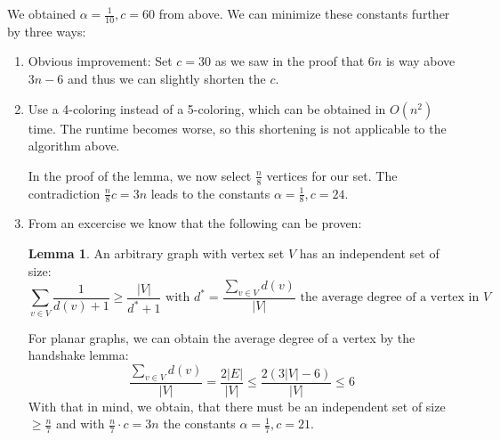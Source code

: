 \documentclass[10pt]{article}
\theoremstyle{definition}
\newtheorem{lemma}{Lemma}
\theoremstyle{remark}
\begin{document}
We obtained \(\alpha = \frac{1}{10}, c = 60\) from above. We can minimize these constants further by three ways:

\begin{enumerate}
    \item Obvious improvement: Set \(c = 30\) as we saw in the proof that \(6n\) is way above \(3n-6\) and thus we can slightly shorten the \(c\).
    \item Use a 4-coloring instead of a 5-coloring, which can be obtained in \(O(n^2)\) time. The runtime becomes worse, so this shortening is not applicable to the algorithm above.

    In the proof of the lemma, we now select \(\frac{n}{8}\) vertices for our set. The contradiction \(\frac{n}{8} c = 3n\) leads to the constants \(\alpha = \frac{1}{8}, c = 24\).
    \item From an excercise we know that the following can be proven:
    \begin{lemma}
        An arbitrary graph with vertex set \(V\) has an independent set of size:
        \[
            \sum_{v \in V} \frac{1}{d(v)+1} \geq \frac{|V|}{d^*+1} \text{ with } d^* = \frac{\sum_{v \in V}d(v)}{|V|} \text{ the average degree of a vertex in } V
        \]
    \end{lemma}
    For planar graphs, we can obtain the average degree of a vertex by the handshake lemma:
    \[
        \frac{\sum_{v \in V}{d(v)}}{|V|} = \frac{2|E|}{|V|} \leq \frac{2(3|V|-6)}{|V|} \leq 6
    \]
    With that in mind, we obtain, that there must be an independent set of size \(\geq \frac{n}{7}\) and with \(\frac{n}{7} \cdot c = 3n\) the constants \(\alpha = \frac{1}{7}, c = 21\).
\end{enumerate}
\end{document}
